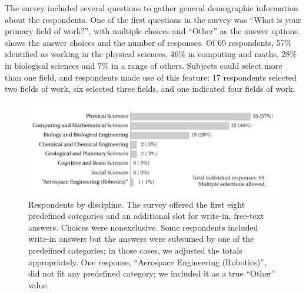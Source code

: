 \documentclass{casicswhitepaper}
\newcommand{\totalRespondents}{69\xspace}
\begin{document}
%
%
%
%
%

The survey included several questions to gather general demographic information about the respondents.  One of the first questions in the survey was ``What is your primary field of work?'', with multiple choices and ``Other'' as the answer options.   shows the answer choices and the number of responses.  Of \totalRespondents respondents, 57\% identified as working in the physical sciences, 46\% in computing and maths, 28\% in biological sciences and 7\% in a range of others.  Subjects could select more than one field, and respondents made use of this feature: 17 respondents selected two fields of work, six selected three fields, and one indicated four fields of work.

\begin{figure}[h]
  \vspace*{-1ex}
  \centering
  \includegraphics{files/plots/respondents-by-discipline.pdf}
  \vspace*{-3.5ex}
  \caption{Respondents by discipline.  The survey offered the first eight predefined categories and an additional slot for write-in, free-text answers.  Choices were nonexclusive.  Some respondents included write-in answers but the answers were subsumed by one of the predefined categories; in those cases, we adjusted the totals appropriately.  One response, ``Aerospace Engineering (Robotics)'', did not fit any predefined category; we included it as a true ``Other'' value.}
  \label{disciplines}
\end{figure}
\end{document}
